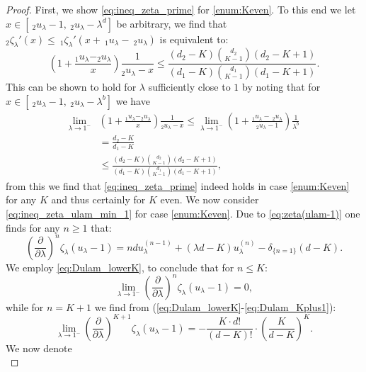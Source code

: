 \documentclass[12pt]{report}
\begin{document}
\begin{proof}
\newline
First, we show \eqref{eq:ineq_zeta_prime} for \ref{enum:Keven}. To this end we let $x \in [\ _2u_{\lambda}-1,\ _2u_{\lambda} - \lambda^d]$ be arbitrary, we find that $_2 \zeta_{\lambda}'(x) \leq\ _1 \zeta_\lambda'(x+\ _1u_{\lambda} -\ _2 u_\lambda)$ is equivalent to:
$$
\left(1 + \frac{_1 u_{\lambda} - _2 u _{\lambda}}{x}\right) \frac{1}{ _2u_\lambda -x} \leq \frac{(d_2-K) \binom{d_2}{K-1} (d_2-K+1)}{(d_1-K) \binom{d_1}{K-1} (d_1-K+1)}.
$$
This can be shown to hold for $\lambda$ sufficiently close to $1$ by noting that
for  $x \in [\ _2u_\lambda - 1,\ _2u_\lambda-\lambda^b]$ we have
\begin{align*}
\lim_{\lambda\rightarrow 1^-} &\left(1 + \frac{_1 u_{\lambda} - _2 u _{\lambda}}{x}\right) \frac{1}{ _2u_\lambda -x} 
\leq \lim_{\lambda\rightarrow 1^-} \left(1+ \frac{_1 u_{\lambda} -\ _2 u _{\lambda}}{_2u_\lambda-1}
\right) \frac{1}{\lambda^b}\\
&= \frac{d_2-K}{d_1-K}\\
&\leq \frac{(d_2-K) \binom{d_2}{K-1} (d_2-K+1)}{(d_1-K) \binom{d_1}{K-1} (d_1-K+1)},
\end{align*}
from this we find that \eqref{eq:ineq_zeta_prime} indeed holds in case \ref{enum:Keven} for any $K$ and
thus certainly for $K$ even. 
\newline
We now consider \eqref{eq:ineq_zeta_ulam_min_1} for case \ref{enum:Keven}. Due to
\eqref{eq:zeta(ulam-1)} one finds for any $n\geq 1$ that:
\begin{equation}\label{eq:Dn_lam_zeta}
\left( \frac{\partial}{\partial \lambda} \right)^n \zeta_\lambda(u_\lambda-1)
=
n d u_\lambda^{(n-1)} + (\lambda d- K) u_\lambda^{(n)} - \delta_{\{n=1\}} (d-K).
\end{equation}
We employ \eqref{eq:Dulam_lowerK}, to conclude that for $n \leq K$:
\begin{equation}\label{eq:Dn_zeta_ulam_min_1}
\lim_{\lambda \rightarrow 1^-} \left( \frac{\partial}{\partial \lambda} \right)^n \zeta_\lambda(u_\lambda-1)=0,
\end{equation}
while for $n=K+1$ we find from (\ref{eq:Dulam_lowerK}-\ref{eq:Dulam_Kplus1}):
\begin{equation}\label{eq:DKplus1_zeta_ulam_min_1}
\lim_{\lambda \rightarrow 1^-} \left( \frac{\partial}{\partial \lambda} \right)^{K+1} \zeta_\lambda(u_\lambda-1)
=
-\frac{K \cdot d!}{(d-K)!} \cdot \left( \frac{K}{d-K} \right)^K.
\end{equation}
We now denote 
\begin{equation}\label{eq:Hn_proof_LLdK}

\end{equation}
\end{proof}
\end{document}
